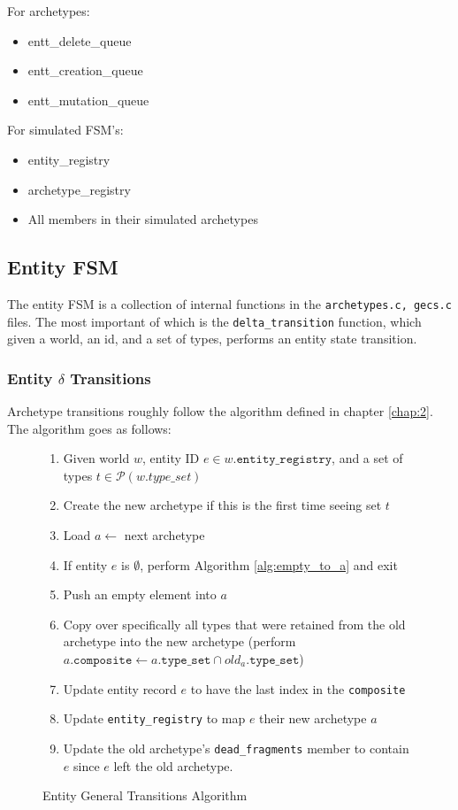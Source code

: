 For archetypes:
\begin{itemize}
    \item entt\_delete\_queue
    \item entt\_creation\_queue
    \item entt\_mutation\_queue
\end{itemize}

For simulated FSM's:
\begin{itemize}
    \item entity\_registry
    \item archetype\_registry
    \item All members in their simulated archetypes
\end{itemize}

\subsection{Entity FSM}
The entity FSM is a collection of internal functions in the \texttt{archetypes.c, gecs.c} files. The most important of which is the \texttt{delta\_transition} function, which given a world, an id, and a set of types, performs an entity state transition.

\subsubsection{Entity $\delta$ Transitions}
Archetype transitions roughly follow the algorithm defined in chapter \ref{chap:2}. The algorithm goes as follows:

\begin{figure}[htbp]
    \begin{enumerate}
        \item Given world $w$, entity ID $e \in w.\texttt{entity\_registry}$, and a set of types $t \in \mathcal{P}(w.type\_set)$
        \item Create the new archetype if this is the first time seeing set $t$
        \item Load $a \leftarrow$ next archetype
        \item If entity $e$ is $\emptyset$, perform Algorithm \ref{alg:empty_to_a} and exit
        \item Push an empty element into $a$
        \item Copy over specifically all types that were retained from the old archetype into the new archetype (perform $a.\texttt{composite} \leftarrow a.\texttt{type\_set} \cap old_a.\texttt{type\_set}$)
        \item Update entity record $e$ to have the last index in the \texttt{composite}
        \item Update \texttt{entity\_registry} to map $e$ their new archetype $a$
        \item Update the old archetype's \texttt{dead\_fragments} member to contain $e$ since $e$ left the old archetype.
    \end{enumerate} 
    \caption{Entity General Transitions Algorithm}
    \label{alg:transition}
\end{figure}


